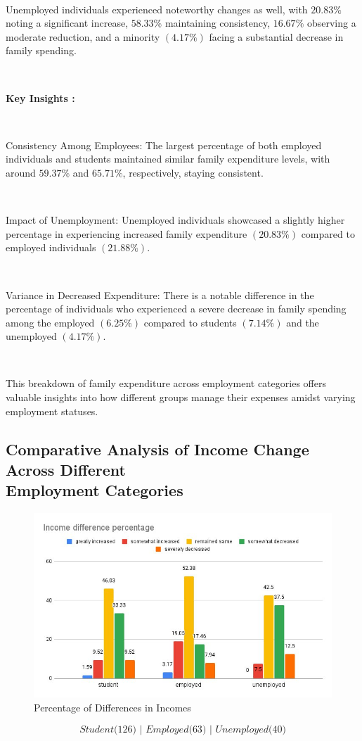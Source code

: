 \

Unemployed individuals experienced noteworthy changes as well, with $20.83\%$ noting a significant increase, $58.33\%$ maintaining consistency, $16.67\%$ observing a moderate reduction, and a minority $(4.17\%)$ facing a substantial decrease in family spending.

\newpage 

\

\textbf{Key Insights : }

\ 

Consistency Among Employees:  The largest percentage of both employed individuals and students maintained similar family expenditure levels, with around $59.37\%$ and $65.71\%$, respectively, staying consistent.

\ 

Impact of Unemployment: Unemployed individuals showcased a slightly higher percentage in experiencing increased family expenditure $(20.83\%)$ compared to employed individuals $(21.88\%)$.

\ 

Variance in Decreased Expenditure: There is a notable difference in the percentage of individuals who experienced a severe decrease in family spending among the employed $(6.25\%)$ compared to students $(7.14\%)$ and the unemployed $(4.17\%)$.

\ 

This breakdown of family expenditure across employment categories offers valuable insights into how different groups manage their expenses amidst varying employment statuses.


\subsection{Comparative Analysis of Income Change Across Different\\ Employment Categories}

\begin{figure}[h!]
	\centering
	\includegraphics[width=0.9\linewidth]{IMAGES/Image 34.jpeg}
	\caption{Percentage of Differences in Incomes}
	\label{G34}
\end{figure}
$$\textit{Student($126$) | Employed($63$) | Unemployed($40$)}$$

